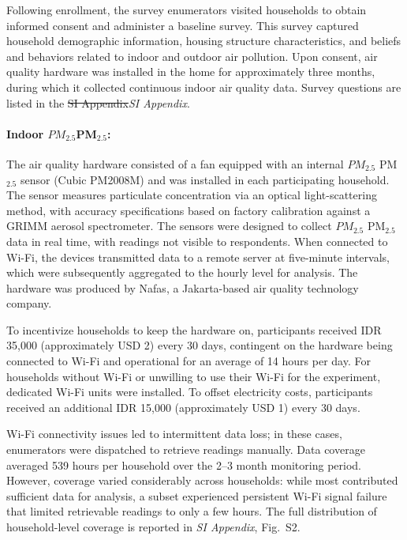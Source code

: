 \documentclass[reqno,12pt,notitlepage]{article}
\providecommand{\DIFadd}[1]{{\protect\color{BLUE}#1}} %
\providecommand{\DIFdel}[1]{{\protect\color{red}\sout{#1}}} %
\providecommand{\DIFaddbegin}{} %
\providecommand{\DIFaddend}{} %
\providecommand{\DIFdelbegin}{} %
\providecommand{\DIFdelend}{} %
\begin{document}
Following enrollment, the survey enumerators visited households to obtain informed consent and administer a baseline survey. This survey captured household demographic information, housing structure characteristics, and beliefs and behaviors related to indoor and outdoor air pollution. Upon consent, air quality hardware was installed in the home for approximately three months, during which it collected continuous indoor air quality data. Survey questions are listed in the \DIFdelbegin \DIFdel{SI Appendix}\DIFdelend \DIFaddbegin \DIFadd{\textit{SI Appendix}}\DIFaddend .

\paragraph{Indoor \DIFdelbegin \DIFdel{$PM_{2.5}$}\DIFdelend \DIFaddbegin \DIFadd{PM$_{2.5}$}\DIFaddend :} The air quality hardware consisted of a fan equipped with an internal \DIFdelbegin \DIFdel{$PM_{2.5}$ }\DIFdelend \DIFaddbegin \DIFadd{PM$_{2.5}$ }\DIFaddend sensor (Cubic PM2008M) and was installed in each participating household. The sensor measures particulate concentration via an optical light-scattering method, with accuracy specifications based on factory calibration against a GRIMM aerosol spectrometer. 
The sensors were designed to collect \DIFdelbegin \DIFdel{$PM_{2.5}$ }\DIFdelend \DIFaddbegin \DIFadd{PM$_{2.5}$ }\DIFaddend data in real time, with readings not visible to respondents. When connected to Wi-Fi, the devices transmitted data to a remote server at five-minute intervals, which were subsequently aggregated to the hourly level for analysis. The hardware was produced by Nafas, a Jakarta-based air quality technology company.

To incentivize households to keep the hardware on, participants received IDR 35,000 (approximately USD 2) every 30 days, contingent on the hardware being connected to Wi-Fi and operational for an average of 14 hours per day. For households without Wi-Fi or unwilling to use their Wi-Fi for the experiment, dedicated Wi-Fi units were installed. To offset electricity costs, participants received an additional IDR 15,000 (approximately USD 1) every 30 days.

\DIFaddbegin \DIFadd{Wi-Fi connectivity issues led to intermittent data loss; in these cases, enumerators were dispatched to retrieve readings manually. Data coverage averaged 539 hours per household over the 2--3 month monitoring period. However, coverage varied considerably across households: while most contributed sufficient data for analysis, a subset experienced persistent Wi-Fi signal failure that limited retrievable readings to only a few hours. The full distribution of household-level coverage is reported in \textit{SI Appendix}, Fig.\ S2.
}
\end{document}

